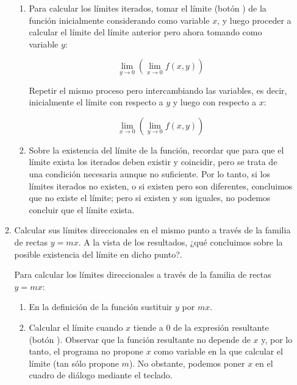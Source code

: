 \begin{enumerate}[leftmargin=*]
\begin{enumerate}
\begin{indicacion}
{




\begin{enumerate}

\item Para calcular los límites iterados, tomar el límite (botón
) de la función inicialmente considerando
como variable $x$, y luego proceder a calcular el límite del límite
anterior pero ahora tomando como variable $y$:

\[
\mathop {\lim }\limits_{y \to 0 } \left( {\mathop {\lim
}\limits_{x \to 0 } f(x,y)} \right)
\]

Repetir el mismo proceso pero intercambiando las variables, es
decir, inicialmente el límite con respecto a $y$ y luego con
respecto a $x$:

\[ \mathop {\lim }\limits_{x \to 0 } \left( {\mathop {\lim
}\limits_{y \to 0 } f(x,y)} \right)
\]

\item Sobre la existencia del límite de la función, recordar que
para que el límite exista los iterados deben existir y coincidir,
pero se trata de una condición necesaria aunque no suficiente. Por
lo tanto, si los límites iterados no existen, o si existen pero
son diferentes, concluimos que no existe el límite; pero si
existen y son iguales, no podemos concluir que el límite exista.

\end{enumerate}

}
\end{indicacion}


  \item Calcular sus límites direccionales en el mismo punto a través de la familia
  de rectas $y=mx$. A la vista de los resultados, ¿qué concluimos
  sobre la posible existencia del límite en dicho punto?.

\begin{indicacion}
{Para calcular los límites direccionales a través de la familia de
rectas $y=mx$:

\begin{enumerate}

\item En la definición de la función sustituir $y$ por $mx$.

\item Calcular el límite cuando $x$ tiende a 0 de la expresión
resultante (botón ). Observar que la
función resultante no depende de $x$ y, por lo tanto, el programa no
propone $x$ como variable en la que calcular el límite (tan sólo
propone $m$). No obstante, podemos poner $x$ en el cuadro de diálogo
mediante el teclado.


\end{enumerate}}
\end{indicacion}
\end{enumerate}
\end{enumerate}
